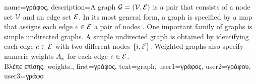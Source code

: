 {name={\foreignlanguage{greek}{γράφος}},
	description={A graph $\mathcal{G} = \left( \mathcal{V},\mathcal{E} \right)$ is a pair that consists of 
		a node set $\mathcal{V}$ and an edge set $\mathcal{E}$. In its most general form, a graph is 
		specified by a map that assigns each edge $e \in \mathcal{E}$ a pair of nodes \cite{RockNetworks}. 
		One important family of graphs is simple undirected graphs. A simple undirected graph 
		is obtained by identifying each edge $e \in \mathcal{E}$ with two different nodes $\{i,i'\}$. 
		Weighted graphs also specify numeric \gls{weights} $A_{e}$ for each 
		edge $e \in \mathcal{E}$.\\
		\foreignlanguage{greek}{Βλέπε επίσης:} \gls{weights}.},
		first={\foreignlanguage{greek}{γράφος}},
		text={graph},
		user1={\foreignlanguage{greek}{γράφος}}, %
  		user2={\foreignlanguage{greek}{γράφου}}, %
		user3={\foreignlanguage{greek}{γράφο}} %
}

